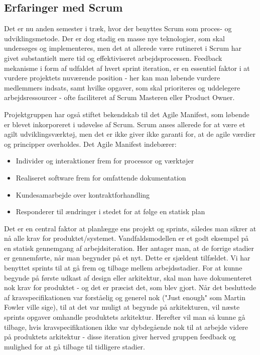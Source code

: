 \documentclass[a4paper,12pt,fleqn,oneside]{article}
\begin{document}
\subsection{Erfaringer med Scrum}
Det er nu anden semester i træk, hvor der benyttes Scrum som proces- og udviklingsmetode. Der er dog stadig en masse nye teknologier, som skal undersøges og implementeres, men det at allerede være rutineret i Scrum har givet substantielt mere tid og effektiviseret arbejdsprocessen. Feedback mekanisme i form af udfaldet af hvert sprint iteration, er en essentiel faktor i at vurdere projektets nuværende position - her kan man løbende vurdere medlemmers indsats, samt hvilke opgaver, som skal prioriteres og uddelegere arbejdsressourcer - ofte faciliteret af Scrum Masteren eller Product Owner. 

Projektgruppen har også stiftet bekendskab til det Agile Manifest, som løbende er blevet inkorporeret i udøvelse af Scrum. Scrum anses allerede for at være et agilt udviklingsværktøj, men det er ikke giver ikke garanti for, at de agile værdier og principper overholdes.
Det Agile Manifest indebærer:  
\begin{itemize}
    \item Individer og interaktioner frem for processor og værktøjer
    \item Realiseret software frem for omfattende dokumentation 
    \item Kundesamarbejde over kontraktforhandling 
    \item Responderer til ændringer i stedet for at følge en statisk plan
\end{itemize}
Det er en central faktor at planlægge ens projekt og sprints, således man sikrer at nå alle krav for produktet/systemet. Vandfaldsmodellen er et godt eksempel på en statisk gennemgang af arbejdsiteration. Her antager man, at de forrige stadier er gennemførte, når man begynder på et nyt. Dette er sjældent tilfældet. Vi har benyttet sprints til at gå frem og tilbage mellem arbejdsstadier. For at kunne begynde på første udkast af design eller arkitektur, skal man have dokumenteret nok krav for produktet - og det er præcist det, som blev gjort. Når det besluttede af kravspecifikationen var forståelig og generel nok ("Just enough" som Martin Fowler ville sige), til at det var muligt at begynde på arkitekturen, vil næste sprints opgaver omhandle produktets arkitektur. Herefter vil man så kunne gå tilbage, hvis kravspecifikationen ikke var dybdegående nok til at arbejde videre på produktets arkitektur - disse iteration giver herved gruppen feedback og mulighed for at gå tilbage til tidligere stadier.
\end{document}
